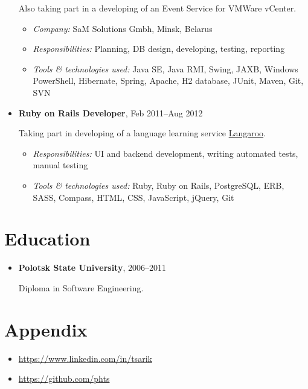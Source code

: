 \documentclass[a4paper, 12pt]{article}
\newcommand{\position}[1]{
    \textbf{#1}}
\newcommand{\itemlabel}[1]{
    \textit{#1:}}
\begin{document}
\begin{itemize}
            Also taking part in a developing of an Event Service for VMWare vCenter.

            \begin{itemize}
                \item \itemlabel{Company} SaM Solutions Gmbh, Minsk, Belarus
                \item \itemlabel{Responsibilities} Planning, DB design, developing, testing, reporting
                \item \itemlabel{Tools \& technologies used} Java SE, Java RMI, Swing, JAXB, Windows PowerShell, Hibernate, Spring, Apache, H2 database, JUnit, Maven, Git, SVN
            \end{itemize}

        \item \position{Ruby on Rails Developer}, Feb 2011--Aug 2012

            Taking part in developing of a language learning service \href{http://langaroo.com}{Langaroo}.

            \begin{itemize}
                \item \itemlabel{Responsibilities} UI and backend development, writing automated tests, manual testing
                \item \itemlabel{Tools \& technologies used} Ruby, Ruby on Rails, PostgreSQL, ERB, SASS, Compass, HTML, CSS, JavaScript, jQuery, Git
            \end{itemize}

    \end{itemize}


\section*{Education}

    \begin{itemize}

        \item \position{Polotsk State University}, 2006--2011

            Diploma in Software Engineering.

    \end{itemize}

\section*{Appendix}

    \begin{itemize}
        \item \href{https://www.linkedin.com/in/tsarik}{https://www.linkedin.com/in/tsarik}
        \item \href{https://github.com/phts}{https://github.com/phts}
    \end{itemize}
\end{document}
